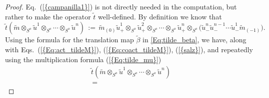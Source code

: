 \documentclass[reqno, a4paper, 10pt]{amsart}
\numberwithin{equation}{section}
\theoremstyle{plain}
\theoremstyle{definition}
\theoremstyle{remark}
\begin{document}
\begin{proof}
Eq.~{{\rm (}\ref{{campanilla1}}{\rm )}} is not directly needed in the computation, but rather to make the operator $\tilde{t}$ well-defined.
By definition we know that 
$$
{\tilde{{t}}}({\tilde{{m}}}{\otimes_{\scriptscriptstyle{{S^{{{o}}}}}}}{\tilde{{u}}}^1{\otimes_{\scriptscriptstyle{{S^{{{o}}}}}}}\cdots{\otimes_{\scriptscriptstyle{{S^{{{o}}}}}}}{\tilde{{u}}}^n)\,:=\,{\tilde{{m}}}_{(0)}{\tilde{{u}}}^1_{+} {\otimes_{\scriptscriptstyle{{S^{{{o}}}}}}}{\tilde{{u}}}^2_{+}{\otimes_{\scriptscriptstyle{{S^{{{o}}}}}}} \cdots {\otimes_{\scriptscriptstyle{{S^{{{o}}}}}}}{\tilde{{u}}}^n_{+}{\otimes_{\scriptscriptstyle{{S^{{{o}}}}}}} {\big( {{\tilde{{u}}}^n_{-}{\tilde{{u}}}^{n-1}_- \cdots {\tilde{{u}}}^1_{-}{\tilde{{m}}}_{(-1)}} \big)}. 
$$ 
Using the formula for the translation map ${\tilde{{\beta}}}$ in \eqref{Eq:tilde_beta}, we have, along with Eqs.~{{\rm (}\ref{{Eq:act_tildeM}}{\rm )}}, {{\rm (}\ref{{Eq:coact_tildeM}}{\rm )}}, {{\rm (}\ref{{salz}}{\rm )}}, and repeatedly using the multiplication formula {{\rm (}\ref{{Eq:tilde_mu}}{\rm )}}
\begin{multline*}
{\tilde{{t}}}({\tilde{{m}}}{\otimes_{\scriptscriptstyle{{S^{{{o}}}}}}}{\tilde{{u}}}^1{\otimes_{\scriptscriptstyle{{S^{{{o}}}}}}}\cdots{\otimes_{\scriptscriptstyle{{S^{{{o}}}}}}}{\tilde{{u}}}^n) \\ \,=\,

\end{multline*}
\end{proof}
\end{document}
